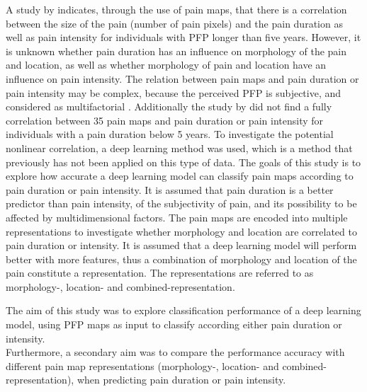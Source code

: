 \noindent
A study by \citeauthor{Boudreau2017} \citep{Boudreau2017} indicates, through the use of pain maps, that there is a correlation between the size of the pain (number of pain pixels) and the pain duration as well as pain intensity for individuals with PFP longer than five years.\citep{Boudreau2017}
However, it is unknown whether pain duration has an influence on morphology of the pain and location, as well as  whether morphology of pain and location have an influence on pain intensity.\newline
\noindent
The relation between pain maps and pain duration or pain intensity may be complex, because the perceived PFP is subjective, and considered as multifactorial \citep{Dansie2013}. Additionally the study by \citeauthor{Boudreau2017} \citep{Boudreau2017} did not find a fully correlation between 35 pain maps and pain duration or pain intensity for individuals with a pain duration below 5 years. To investigate the potential nonlinear correlation, a deep learning method was used, which is a method that previously has not been applied on this type of data. \newline
\noindent
The goals of this study is to explore how accurate a deep learning model can classify pain maps according to pain duration or pain intensity. It is assumed that pain duration is a better predictor than pain intensity, of the subjectivity of pain, and its possibility to be affected by multidimensional factors. 
The pain maps are encoded into multiple representations to investigate whether morphology and location are correlated to pain duration or intensity.\newline
\noindent
It is assumed that a deep learning model will perform better with more features, thus a combination of morphology and location of the pain constitute a representation.  The representations are referred to as morphology-, location- and combined-representation.


\noindent
The aim of this study was to explore classification performance of a deep learning model, using PFP maps as input to classify according either pain duration or intensity. \\
\noindent
Furthermore, a secondary aim was to compare the performance accuracy with different pain map representations (morphology-, location- and combined-representation), when predicting pain duration or pain intensity. 



